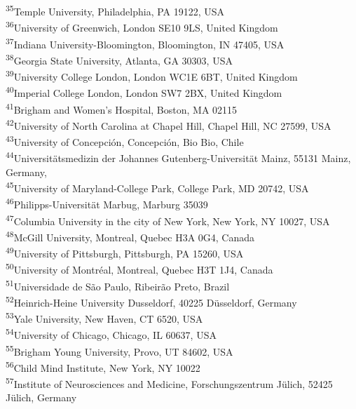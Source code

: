 \documentclass[fleqn,10pt,inline]{wlscirep}
\begin{document}
\textsuperscript{35}Temple University, Philadelphia, PA 19122, USA\\
\textsuperscript{36}University of Greenwich, London SE10 9LS, United Kingdom\\
\textsuperscript{37}Indiana University-Bloomington, Bloomington, IN 47405, USA\\
\textsuperscript{38}Georgia State University, Atlanta, GA 30303, USA\\
\textsuperscript{39}University College London, London WC1E 6BT, United Kingdom\\
\textsuperscript{40}Imperial College London, London SW7 2BX, United Kingdom\\
\textsuperscript{41}Brigham and Women's Hospital, Boston, MA 02115\\
\textsuperscript{42}University of North Carolina at Chapel Hill, Chapel Hill, NC 27599, USA\\
\textsuperscript{43}University of Concepción, Concepción, Bio Bio, Chile\\
\textsuperscript{44}Universitätsmedizin der Johannes Gutenberg-Universität Mainz, 55131 Mainz, Germany,\\
\textsuperscript{45}University of Maryland-College Park, College Park, MD 20742, USA\\
\textsuperscript{46}Philipps-Universität Marbug, Marburg 35039\\
\textsuperscript{47}Columbia University in the city of New York, New York, NY 10027, USA\\
\textsuperscript{48}McGill University, Montreal, Quebec H3A 0G4, Canada\\
\textsuperscript{49}University of Pittsburgh, Pittsburgh, PA 15260, USA\\
\textsuperscript{50}University of Montréal, Montreal, Quebec H3T 1J4, Canada\\
\textsuperscript{51}Universidade de São Paulo, Ribeirão Preto, Brazil\\
\textsuperscript{52}Heinrich-Heine University Dusseldorf, 40225 Düsseldorf, Germany\\
\textsuperscript{53}Yale University, New Haven, CT 6520, USA\\
\textsuperscript{54}University of Chicago, Chicago, IL 60637, USA\\
\textsuperscript{55}Brigham Young University, Provo, UT 84602, USA\\
\textsuperscript{56}Child Mind Institute, New York, NY 10022\\
\textsuperscript{57}Institute of Neurosciences and Medicine, Forschungszentrum Jülich, 52425 Jülich, Germany\\
\end{document}

